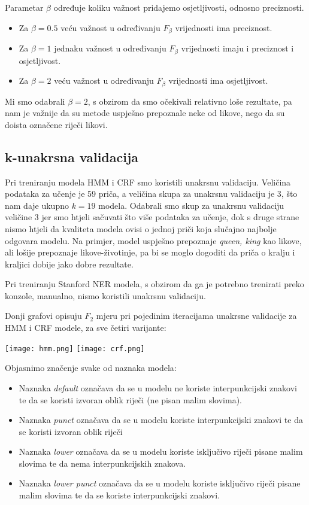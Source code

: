 \documentclass[conference]{IEEEtran}
\begin{document}
		Parametar $\beta$ određuje koliku važnost pridajemo osjetljivosti, odnosno preciznosti.
		\begin{itemize}
			\item Za $\beta = 0.5$ veću važnost u određivanju $F_\beta$ vrijednosti ima preciznost.
			\item Za $\beta = 1$ jednaku važnost u određivanju $F_\beta$ vrijednosti imaju i preciznost i osjetljivost.
			\item Za $\beta = 2$ veću važnost u određivanju $F_\beta$ vrijednosti ima osjetljivost.
		\end{itemize}
		
		Mi smo odabrali $\beta = 2$, s obzirom da smo očekivali relativno loše rezultate, pa nam je važnije da su metode uspješno prepoznale neke od likove, nego da su doista označene riječi likovi.
		

	\subsection{k-unakrsna validacija}
	
		Pri treniranju modela HMM i CRF smo koristili unakrsnu validaciju. Veličina podataka za učenje je 59 priča, a veličina skupa za unakrsnu validaciju je 3, što nam daje ukupno $k=19$ modela. Odabrali smo skup za unakrsnu validaciju veličine 3 jer smo htjeli sačuvati što više podataka za učenje, dok s druge strane nismo htjeli da kvaliteta modela ovisi o jednoj priči koja slučajno najbolje odgovara modelu. Na primjer, model uspješno prepoznaje \textit{queen, king} kao likove, ali lošije prepoznaje likove-životinje, pa bi se moglo dogoditi da priča o kralju i kraljici dobije jako dobre rezultate.
		
		Pri treniranju Stanford NER modela, s obzirom da ga je potrebno trenirati preko konzole, manualno, nismo koristili unakrsnu validaciju.
		
		
		Donji grafovi opisuju $F_2$ mjeru pri pojedinim iteracijama unakrsne validacije za HMM i CRF modele, za sve četiri varijante:
		
		\texttt{[image: hmm.png]}
		\texttt{[image: crf.png]}
		
		Objasnimo značenje svake od naznaka modela:
		\begin{itemize}
			\item Naznaka \textit{default} označava da se u modelu ne koriste interpunkcijski znakovi te da se koristi izvoran oblik riječi (ne pisan malim slovima).
			\item Naznaka \textit{punct} označava da se u modelu koriste interpunkcijski znakovi te da se koristi izvoran oblik riječi
			\item Naznaka \textit{lower} označava da se u modelu koriste isključivo riječi pisane malim slovima te da nema interpunkcijskih znakova. 
			\item Naznaka \textit{lower punct} označava da se u modelu koriste isključivo riječi pisane malim slovima te da se koriste interpunkcijski znakovi.
		\end{itemize}
		
\end{document}
